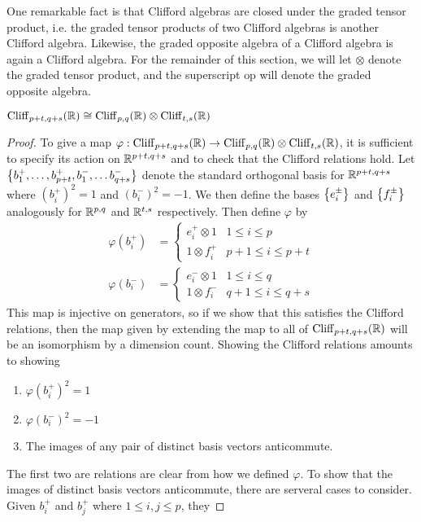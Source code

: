 One remarkable fact is that Clifford algebras are closed under the graded
tensor product, i.e. the graded tensor products of two Clifford algebras is
another Clifford algebra. Likewise, the graded opposite algebra of a Clifford
algebra is again a Clifford algebra. For the remainder of this section,
we will let $\otimes$ denote the graded tensor product, and the superscript
$\text{op}$ will denote the graded opposite algebra.
%
\begin{thm}
$\operatorname{Cliff}_{p+t,q+s}(\mathbb{R}) \cong \operatorname{Cliff}_{p,q}(\mathbb{R}) \otimes \operatorname{Cliff}_{t,s}(\mathbb{R})$
\end{thm}
%
\begin{proof}
To give a map $\varphi : \operatorname{Cliff}_{p+t,q+s}(\mathbb{R}) \to \operatorname{Cliff}_{p,q}(\mathbb{R}) \otimes
\operatorname{Cliff}_{t,s}(\mathbb{R})$, it is sufficient to specify its action on $\mathbb{R}^{p+t,q+s}$ and
to check that the Clifford relations hold. Let
$\left\lbrace b_1^+,\ldots, b_{p+t}^+, b_1^-, \ldots b_{q+s}^- \right\rbrace$ denote the standard
orthogonal basis for $\mathbb{R}^{p+t,q+s}$ where $(b_i^+)^2 = 1$ and $(b_i^-)^2 = -1$.
We then define the bases $\left\lbrace e_i^\pm \right\rbrace$ and $\left\lbrace f_i^\pm \right\rbrace$ analogously for
$\mathbb{R}^{p,q}$ and $\mathbb{R}^{t,s}$ respectively. Then define $\varphi$ by
%
\begin{align*}
\varphi(b_i^+) &= \begin{cases}
e_i^+ \otimes 1 & 1 \leq i \leq p \\
1 \otimes f_i^+ & p+1 \leq i \leq p+t
\end{cases} \\
\varphi(b_i^-) &= \begin{cases}
e_i^- \otimes 1 & 1 \leq i \leq q \\
1 \otimes f_i^- & q+1 \leq i \leq q+s
\end{cases}
\end{align*}
%
This map is injective on generators, so if we show that this satisfies the
Clifford relations, then the map given by extending the map to all of
$\operatorname{Cliff}_{p+t,q+s}(\mathbb{R})$ will be an isomorphism by a dimension count. Showing
the Clifford relations amounts to showing
%
\begin{enumerate}
  \item $\varphi(b_i^+)^2 = 1$
  \item $\varphi(b_i^-)^2 = -1$
  \item The images of any pair of distinct basis vectors anticommute.
\end{enumerate}
%
The first two are relations are clear from how we defined $\varphi$. To show
that the images of distinct basis vectors anticommute, there are serveral
cases to consider. Given $b_i^+$ and $b_j^+$ where $1 \leq i,j \leq p$, they

\end{proof}
